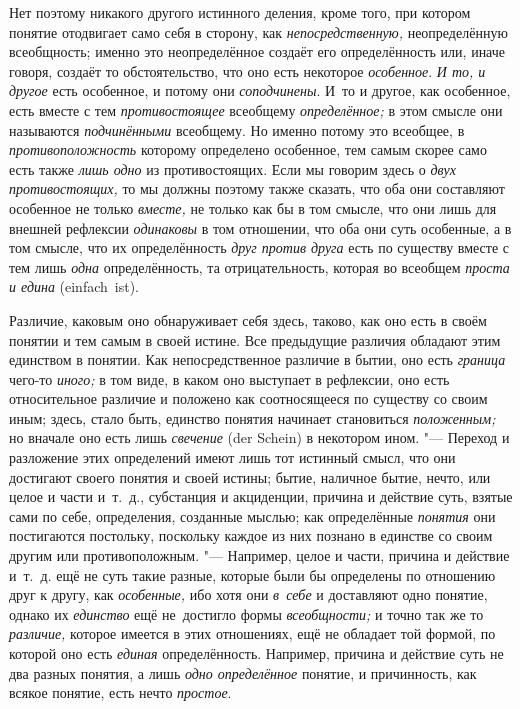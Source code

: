 \label{bkm:bm22a}Нет поэтому никакого другого истинного
деления, кроме того, при котором понятие отодвигает само себя в сторону,
как {\em непосредственную,} неопределённую всеобщность; именно это
неопределённое создаёт его определённость или, иначе говоря,
создаёт то обстоятельство, что оно есть некоторое
{\em особенное}. {\em И то, и другое} есть особенное, и потому они
{\em соподчинены}. И~то и другое, как особенное, есть вместе с тем
{\em противостоящее} всеобщему {\em определённое;} в
этом смысле они называются {\em подчинёнными}
всеобщему. Но именно потому это всеобщее, в {\em противоположность}
которому определено особенное, тем самым скорее само есть
также {\em лишь одно} из противостоящих. Если мы говорим здесь о
{\em двух противостоящих,}
то мы должны поэтому также сказать, что оба они составляют
особенное не только {\em вместе,} не только как бы в том смысле,
что они лишь для внешней рефлексии {\em одинаковы}
в том отношении, что оба они суть особенные, а в том смысле,
что их определённость {\em друг против
друга} есть по существу вместе с тем лишь {\em одна}
определённость, та отрицательность, которая во всеобщем
{\em проста и едина} (einfach~ist).

Различие, каковым оно обнаруживает себя здесь, таково, как оно
есть в своём понятии и тем самым в своей истине. Все предыдущие различия
обладают этим единством в
понятии. Как непосредственное
различие в бытии, оно есть {\em граница} чего-то {\em иного;} в том
виде, в каком оно выступает в рефлексии, оно есть относительное различие и
положено как соотносящееся по существу со своим иным; здесь, стало быть,
единство понятия начинает становиться {\em положенным;} но вначале оно есть
лишь {\em свечение} (der Schein) в некотором ином. "--- Переход и
разложение этих определений имеют лишь тот истинный смысл, что они
достигают своего понятия и своей истины; бытие, наличное бытие, нечто, или
целое и части и~т.~д., субстанция и акциденции, причина и действие суть,
взятые сами по себе, определения, созданные мыслью; как определённые
{\em понятия} они
постигаются постольку, поскольку каждое из них познано в единстве со своим
другим или противоположным. "--- Например, целое и части,
причина и действие и~т.~д. ещё не суть такие разные, которые были бы
определены по отношению друг к другу, как {\em особенные,} ибо хотя они
{\em в~себе} и доставляют одно понятие, однако их {\em единство} ещё
не~достигло формы {\em всеобщности;} и точно так же то {\em различие,} которое
имеется в этих отношениях, ещё не обладает той формой, по которой оно есть
{\em единая} определённость. Например, причина и действие суть не два разных
понятия, а лишь {\em одно определённое} понятие, и причинность, как всякое
понятие, есть нечто {\em простое}.

